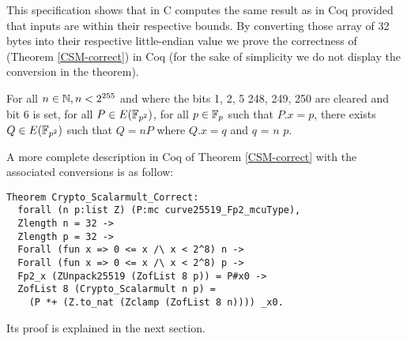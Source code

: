 This specification shows that  in C computes the same
result as  in Coq provided that inputs are within their respective
bounds.
By converting those array of 32 bytes into their respective little-endian value
we prove the correctness of  (Theorem \ref{CSM-correct})
in Coq (for the sake of simplicity we do not display the conversion in the theorem).
\begin{theorem}
\label{CSM-correct}
For all $n \in \mathbb{N}, n < 2^{255}$ and where the bits 1, 2, 5 248, 249, 250
are cleared and bit 6 is set, for all $P \in E(\mathbb{F}_{p^2})$,
for all $p \in \mathbb{F}_{p}$ such that $P.x = p$,
there exists $Q \in E(\mathbb{F}_{p^2})$ such that $Q = nP$ where $Q.x = q$ and $q$ =  $n$ $p$.
\end{theorem}
A more complete description in Coq of Theorem \ref{CSM-correct} with the associated conversions
is as follow:
\begin{lstlisting}[language=Coq]
Theorem Crypto_Scalarmult_Correct:
  forall (n p:list Z) (P:mc curve25519_Fp2_mcuType),
  Zlength n = 32 ->
  Zlength p = 32 ->
  Forall (fun x => 0 <= x /\ x < 2^8) n ->
  Forall (fun x => 0 <= x /\ x < 2^8) p ->
  Fp2_x (ZUnpack25519 (ZofList 8 p)) = P#x0 ->
  ZofList 8 (Crypto_Scalarmult n p) =
    (P *+ (Z.to_nat (Zclamp (ZofList 8 n)))) _x0.
\end{lstlisting}
Its proof is explained in the next section.
